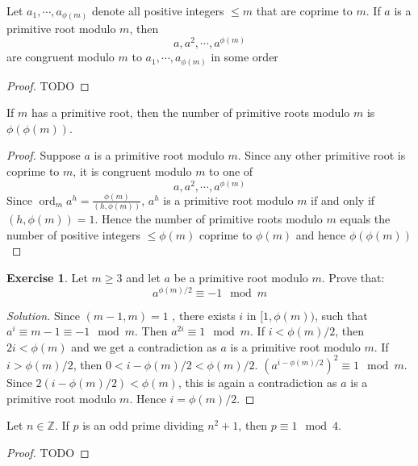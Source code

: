 \documentclass[12pt,letterpaper]{book}
\theoremstyle{definition}
\newtheorem*{exercise}{Exercise}
\newenvironment{solution}
  {\renewcommand\qedsymbol{$\blacksquare$}\begin{proof}[Solution]}
  {\end{proof}}
\newcommand{\Z}{\mathbb{Z}}
\DeclareMathOperator{\ord}{ord}
\begin{document}
\begin{theorem}
  Let $a_1, \cdots, a_{\phi(m)}$ denote all positive integers $\leq m$ that are coprime to $m$. If $a$ is a primitive root modulo $m$, then 
  \[a,a^2, \cdots, a^{\phi(m)}\]
  are congruent modulo $m$ to $a_1, \cdots, a_{\phi(m)}$ in some order
\end{theorem}
\begin{proof}
  TODO 
\end{proof}

\begin{corollary}
  If $m$ has a primitive root, then the number of primitive roots modulo $m$ is $\phi(\phi(m))$.
\end{corollary}
\begin{proof}
  Suppose $a$ is a primitive root modulo $m$. Since any other primitive root is coprime to $m$, it is congruent modulo $m$ to one of
  \[a,a^2,\cdots, a^{\phi(m)}\]
  Since $\ord_m a^h = \frac{\phi(m)}{(h,\phi(m))}$, $a^h$ is a primitive root modulo $m$ if and only if $(h, \phi(m)) = 1$. Hence the number of primitive roots modulo $m$ equals the number of positive integers $\leq \phi(m)$ coprime to $\phi(m)$ and hence $\phi(\phi(m))$
\end{proof}

\begin{exercise}
  Let $m \geq 3$ and let $a$ be a primitive root modulo $m$. Prove that:
  \[a^{\phi(m)/2} \equiv -1 \mod m\]
\end{exercise}
\begin{solution}
  Since $(m-1,m) = 1$  , there exists $i$ in $[1,\phi(m))$, such that $a^i \equiv m-1 \equiv -1 \mod m$. Then $a^{2i} \equiv 1 \mod m$. If $i < \phi(m)/2$, then $2i < \phi(m)$ and we get a contradiction as $a$ is a primitive root modulo $m$. If $i > \phi(m)/2$, then $0 < i-\phi(m)/2 < \phi(m)/2$. $(a^{i - \phi(m)/2})^2 \equiv 1 \mod m$. Since $2(i - \phi(m)/2) < \phi(m)$, this is again a contradiction as $a$ is a primitive root modulo $m$. Hence $i = \phi(m)/2$.
\end{solution}

\begin{theorem}
  Let $n \in \Z$. If $p$ is an odd prime dividing $n^2+1$, then $p \equiv 1 \mod 4$. 
\end{theorem}
\begin{proof}
TODO   
\end{proof}
\end{document}
